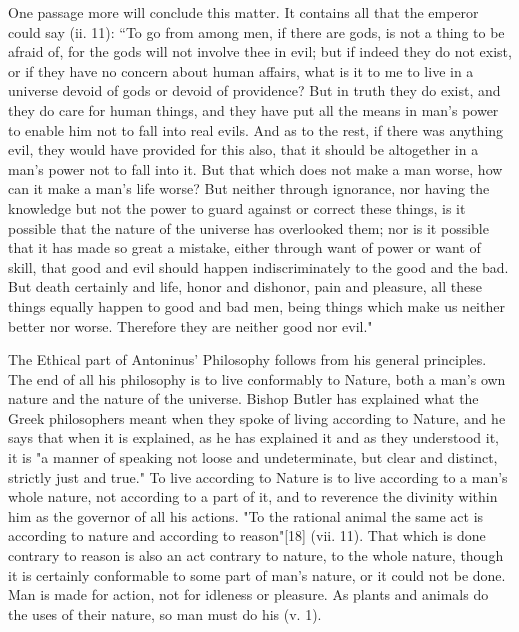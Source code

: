 One passage more will conclude this matter. It contains all that the emperor could say (ii. 11): ``To go from among men, if there are gods, is not a thing to be afraid of, for the gods will not involve thee in evil; but if indeed they do not exist, or if they have no concern about human affairs, what is it to me to live in a universe devoid of gods or devoid of providence? But in truth they do exist, and they do care for human things, and they have put all the means in man's power to enable him not to fall into real evils. And as to the rest, if there was anything evil, they would have provided for this also, that it should be altogether in a man's power not to fall into it. But that which does not make a man worse, how can it make a man's life worse? But neither through ignorance, nor having the knowledge but not the power to guard against or correct these things, is it possible that the nature of the universe has overlooked them; nor is it possible that it has made so great a mistake, either through want of power or want of skill, that good and evil should happen indiscriminately to the good and the bad. But death certainly and life, honor and dishonor, pain and pleasure, all these things equally happen to good and bad men, being things which make us neither better nor worse. Therefore they are neither good nor evil."

The Ethical part of Antoninus' Philosophy follows from his general principles. The end of all his philosophy is to live conformably to Nature, both a man's own nature and the nature of the universe. Bishop Butler has explained what the Greek philosophers meant when they spoke of living according to Nature, and he says that when it is explained, as he has explained it and as they understood it, it is "a manner of speaking not loose and undeterminate, but clear and distinct, strictly just and true." To live according to Nature is to live according to a man's whole nature, not according to a part of it, and to reverence the divinity within him as the governor of all his actions. "To the rational animal the same act is according to nature and according to reason"[18] (vii. 11). That which is done contrary to reason is also an act contrary to nature, to the whole nature, though it is certainly conformable to some part of man's nature, or it could not be done. Man is made for action, not for idleness or pleasure. As plants and animals do the uses of their nature, so man must do his (v. 1).

